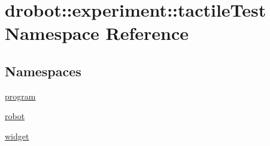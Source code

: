 \hypertarget{namespacedrobot_1_1experiment_1_1tactileTest}{\section{drobot\-:\-:experiment\-:\-:tactile\-Test Namespace Reference}
\label{namespacedrobot_1_1experiment_1_1tactileTest}
}
\subsection*{Namespaces}
\begin{DoxyCompactItemize}
\item 
\hyperlink{namespacedrobot_1_1experiment_1_1tactileTest_1_1program}{program}
\item 
\hyperlink{namespacedrobot_1_1experiment_1_1tactileTest_1_1robot}{robot}
\item 
\hyperlink{namespacedrobot_1_1experiment_1_1tactileTest_1_1widget}{widget}
\end{DoxyCompactItemize}
